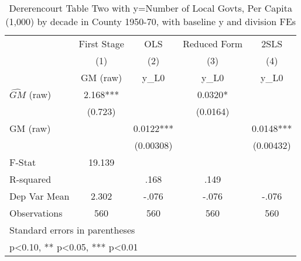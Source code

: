 \begin{table}[htbp]\centering
\def\sym#1{\ifmmode^{#1}\else\(^{#1}\)\fi}
\caption{Dererencourt Table Two with y=Number of Local Govts, Per Capita (1,000) by decade in County 1950-70, with baseline y and division FEs}
\begin{tabular}{l*{4}{c}}
\toprule
                    & First Stage   &         OLS   &Reduced Form   &        2SLS   \\
                    &\multicolumn{1}{c}{(1)}&\multicolumn{1}{c}{(2)}&\multicolumn{1}{c}{(3)}&\multicolumn{1}{c}{(4)}\\
                    &\multicolumn{1}{c}{GM  (raw)}&\multicolumn{1}{c}{y\_L0}&\multicolumn{1}{c}{y\_L0}&\multicolumn{1}{c}{y\_L0}\\
\midrule
$\hat{GM}$ (raw)    &       2.168***&               &      0.0320*  &               \\
                    &     (0.723)   &               &    (0.0164)   &               \\
\addlinespace
GM  (raw)           &               &      0.0122***&               &      0.0148***\\
                    &               &   (0.00308)   &               &   (0.00432)   \\
\midrule
F-Stat              &      19.139   &               &               &               \\
R-squared           &               &        .168   &        .149   &               \\
Dep Var Mean        &       2.302   &       -.076   &       -.076   &       -.076   \\
Observations        &         560   &         560   &         560   &         560   \\
\bottomrule
\multicolumn{5}{l}{\footnotesize Standard errors in parentheses}\\
\multicolumn{5}{l}{\footnotesize * p<0.10, ** p<0.05, *** p<0.01}\\
\end{tabular}
\end{table}

